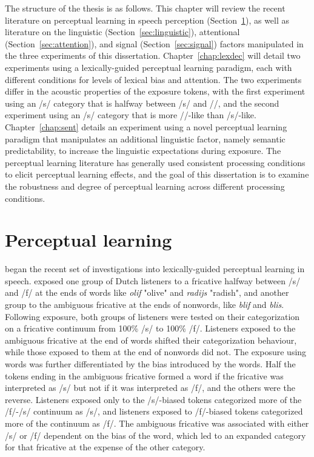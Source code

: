 The structure of the thesis is as follows.
This chapter will review the recent literature on perceptual learning in speech perception (Section~\ref{sec:perceptuallearning}), as well as literature on the linguistic (Section~\ref{sec:linguistic}), attentional (Section~\ref{sec:attention}), and signal (Section~\ref{sec:signal}) factors manipulated in the three experiments of this dissertation.
Chapter~\ref{chap:lexdec} will detail two experiments using a lexically-guided perceptual learning paradigm, each with different conditions for levels of lexical bias and attention.  
The two experiments differ in the acoustic properties of the exposure tokens, with the first experiment using an /s/ category that is halfway between /s/ and /\textesh/, and the second experiment using an /s/ category that is more /\textesh/-like than /s/-like.  
Chapter~\ref{chap:sent} details an experiment using a novel perceptual learning paradigm that manipulates an additional linguistic factor, namely semantic predictability, to increase the linguistic expectations during exposure.
The perceptual learning literature has generally used consistent processing conditions to elicit perceptual learning effects, and the goal of this dissertation is to examine the robustness and degree of perceptual learning across different processing conditions.

\section{Perceptual learning}
\label{sec:perceptuallearning}


\citet{Norris2003} began the recent set of investigations into lexically-guided perceptual learning in speech.
\citet{Norris2003} exposed one group of Dutch listeners to a fricative halfway between /s/ and /f/ at the ends of words like \emph{olif} "olive" and \emph{radijs} "radish", and another group to the ambiguous fricative at the ends of nonwords, like \emph{blif} and \emph{blis}.
Following exposure, both groups of listeners were tested on their categorization on a fricative continuum from 100\% /s/ to 100\% /f/. 
Listeners exposed to the ambiguous fricative at the end of words shifted their categorization behaviour, while those exposed to them at the end of nonwords did not.  The exposure using words was further differentiated by the bias introduced by the words.  
Half the tokens ending in the ambiguous fricative formed a word if the fricative was interpreted as /s/ but not if it was interpreted as /f/, and the others were the reverse.  
Listeners exposed only to the /s/-biased tokens categorized more of the /f/-/s/ continuum as /s/, and listeners exposed to /f/-biased tokens categorized more of the continuum as /f/.  
The ambiguous fricative was associated with either /s/ or /f/ dependent on the bias of the word, which led to an expanded category for that fricative at the expense of the other category.

